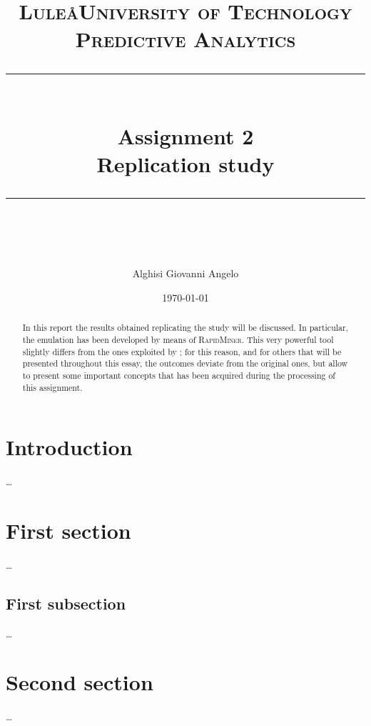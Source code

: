 \documentclass[a4paper]{article}
\title{
	\normalfont \normalsize 
	\textsc{Lule\aa University of Technology\\ 
		Predictive Analytics} \\[10pt]
	\rule{\linewidth}{0.5pt}\\
	\vspace{0.3cm}
	\Large Assignment 2\\
	\vspace{0.3cm}
	\huge \bf Replication study\normalsize
	\vspace{0.3cm}
	\rule{\linewidth}{0.5pt}  \\
}
\author{Alghisi Giovanni Angelo}
\date{\normalsize \today}
\begin{document}
	
	\maketitle
	
	\begin{abstract}
		In this report the results obtained replicating the study \cite{article:muller} will be discussed. In particular, the emulation has been developed by means of \textsc{RapidMiner}. This very powerful tool slightly differs from the ones exploited by \citeauthor{article:muller}; for this reason, and for others that will be presented throughout this essay, the outcomes deviate from the original ones, but allow to present some important concepts that has been acquired during the processing of this assignment. 
	\end{abstract}
	
	\tableofcontents
	
	\section{Introduction}
		\dots
	
	\section{First section}
		\dots
			
		\subsection*{First subsection}
			\dots
			
	\section{Second section}
		\dots
		
	\nocite{*}
	\printbibliography 
		
\end{document}
